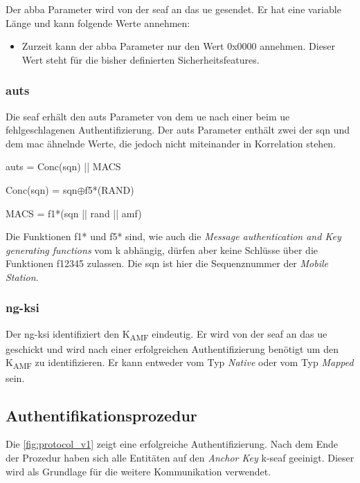 Der \gls{abba} Parameter wird von der \gls{seaf} an das \gls{ue} gesendet.
Er hat eine variable Länge und kann folgende Werte annehmen:
\begin{itemize}
\item Zurzeit kann der \gls{abba} Parameter nur den Wert 0x0000 annehmen. Dieser Wert steht für die bisher definierten Sicherheitsfeatures. %
\end{itemize}

\subsubsection{\gls{auts}}
Die \gls{seaf} erhält den \gls{auts} Parameter von dem \gls{ue} nach einer beim \gls{ue} fehlgeschlagenen Authentifizierung.
Der \gls{auts} Parameter enthält zwei der \gls{sqn} und dem \gls{mac} ähnelnde Werte, die jedoch nicht miteinander in Korrelation stehen. %

\gls{auts} = Conc(\gls{sqn}) || MACS

Conc(\gls{sqn}) = \gls{sqn}$ \oplus $f5*(RAND)

MACS = f1*(\gls{sqn} || \gls{rand} || \gls{amf})

Die Funktionen f1* und f5* sind, wie auch die \textit{Message authentication and Key generating functions} vom \gls{k} abhängig, dürfen aber keine Schlüsse über die Funktionen \gls{f12345} zulassen.
Die \gls{sqn} ist hier die Sequenznummer der \textit{Mobile Station}.

\subsubsection{\gls{ng-ksi}}
Der \gls{ng-ksi} identifiziert den K\textsubscript{AMF} eindeutig.%
Er wird von der \gls{seaf} an das \gls{ue} geschickt und wird nach einer erfolgreichen Authentifizierung benötigt um den K\textsubscript{AMF} zu identifizieren.
Er kann entweder vom Typ \textit{Native} oder vom Typ \textit{Mapped} sein.%


\subsection{Authentifikationsprozedur}

Die \cref{fig:protocol_v1} zeigt eine erfolgreiche Authentifizierung.
Nach dem Ende der Prozedur haben sich alle Entitäten auf den \textit{Anchor Key} \gls{k-seaf} geeinigt.
Dieser wird als Grundlage für die weitere Kommunikation verwendet.

